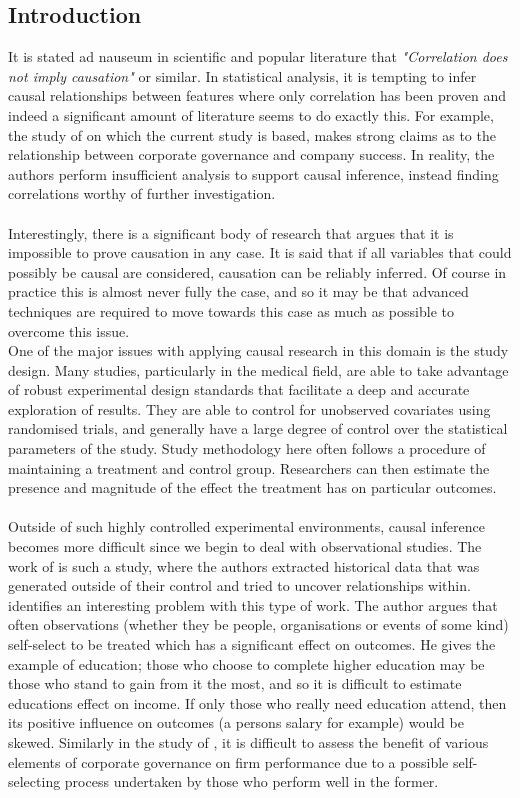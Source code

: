 \subsection{Introduction}
{It is stated ad nauseum in scientific and popular literature that {\it "Correlation does not imply causation"} or similar. In statistical analysis, it is tempting to infer causal relationships between features where only correlation has been proven and indeed a significant amount of literature seems to do exactly this. For example, the study of \cite{moldovan2015learning} on which the current study is based, makes strong claims as to the relationship between corporate governance and company success. In reality, the authors perform insufficient analysis to support causal inference, instead finding correlations worthy of further investigation. \\\\
Interestingly, there is a significant body of research that argues that it is impossible to prove causation in any case. It is said that if all variables that could possibly be causal are considered, causation can be reliably inferred. Of course in practice this is almost never fully the case, and so it may be that advanced techniques are required to move towards this case as much as possible to overcome this issue.     \\
One of the major issues with applying causal research in this domain is the study design. Many studies, particularly in the medical field, are able to take advantage of robust experimental design standards that facilitate a deep and accurate exploration of results. They are able to control for unobserved covariates using randomised trials, and generally have a large degree of control over the statistical parameters of the study. Study methodology here often follows a procedure of maintaining a treatment and control group. Researchers can then estimate the presence and magnitude of the effect the treatment has on particular outcomes. \\\\
Outside of such highly controlled experimental environments, causal inference becomes more difficult since we begin to deal with observational studies. The work of \cite{moldovan2015learning} is such a study, where the authors extracted historical data that was generated outside of their control and tried to uncover relationships within. \cite{esarey2015causal} identifies an interesting problem with this type of work. The author argues that often observations (whether they be people, organisations or events of some kind) self-select to be treated which has a significant effect on outcomes. He gives the example of education; those who choose to complete higher education may be those who stand to gain from it the most, and so it is difficult to estimate educations effect on income. If only those who really need education attend, then its positive influence on outcomes (a persons salary for example) would be skewed. Similarly in the study of \cite{moldovan2015learning}, it is difficult to assess the benefit of various elements of corporate governance on firm performance due to a possible self-selecting process undertaken by those who perform well in the former. \\\\
}
